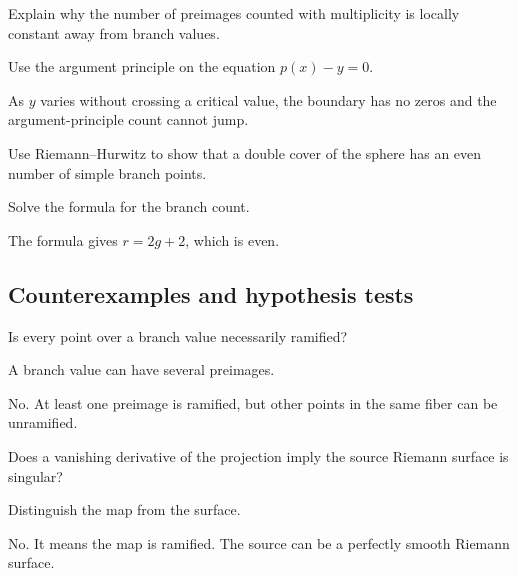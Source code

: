 \begin{exercise}\label{exr:iv24-expand-08}
Explain why the number of preimages counted with multiplicity is locally constant away from branch values.
\end{exercise}
\begin{hint}
Use the argument principle on the equation \(p(x)-y=0\).
\end{hint}
\begin{solution}
As \(y\) varies without crossing a critical value, the boundary has no zeros and the argument-principle count cannot jump.
\end{solution}

\begin{exercise}\label{exr:iv24-expand-09}
Use Riemann--Hurwitz to show that a double cover of the sphere has an even number of simple branch points.
\end{exercise}
\begin{hint}
Solve the formula for the branch count.
\end{hint}
\begin{solution}
The formula gives \(r=2g+2\), which is even.
\end{solution}

\subsection*{Counterexamples and hypothesis tests}

\begin{exercise}\label{exr:iv24-expand-10}
Is every point over a branch value necessarily ramified?
\end{exercise}
\begin{hint}
A branch value can have several preimages.
\end{hint}
\begin{solution}
No. At least one preimage is ramified, but other points in the same fiber can be unramified.
\end{solution}

\begin{exercise}\label{exr:iv24-expand-11}
Does a vanishing derivative of the projection imply the source Riemann surface is singular?
\end{exercise}
\begin{hint}
Distinguish the map from the surface.
\end{hint}
\begin{solution}
No. It means the map is ramified. The source can be a perfectly smooth Riemann surface.
\end{solution}

